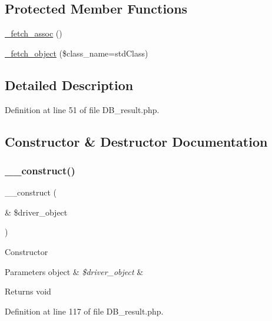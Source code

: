\subsection*{Protected Member Functions}
\begin{DoxyCompactItemize}
\item 
\mbox{\hyperlink{class_c_i___d_b__result_a43a9a92817f1334a1c10752ec44275a0}{\+\_\+fetch\+\_\+assoc}} ()
\item 
\mbox{\hyperlink{class_c_i___d_b__result_a60806be6a9c2488820813c2a7f4fef71}{\+\_\+fetch\+\_\+object}} (\$class\+\_\+name=\textquotesingle{}std\+Class\textquotesingle{})
\end{DoxyCompactItemize}


\subsection{Detailed Description}


Definition at line 51 of file D\+B\+\_\+result.\+php.



\subsection{Constructor \& Destructor Documentation}
\mbox{\label{class_c_i___d_b__result_a8e093c8b6e5733bc3f306385ee426ab7}} 
\subsubsection{\texorpdfstring{\_\_construct()}{\_\_construct()}}
{\footnotesize\ttfamily \+\_\+\+\_\+construct (\begin{DoxyParamCaption}\item[{\&}]{\$driver\+\_\+object }\end{DoxyParamCaption})}

Constructor


\begin{DoxyParams}[1]{Parameters}
object & {\em \$driver\+\_\+object} & \\
\hline
\end{DoxyParams}
\begin{DoxyReturn}{Returns}
void 
\end{DoxyReturn}


Definition at line 117 of file D\+B\+\_\+result.\+php.



